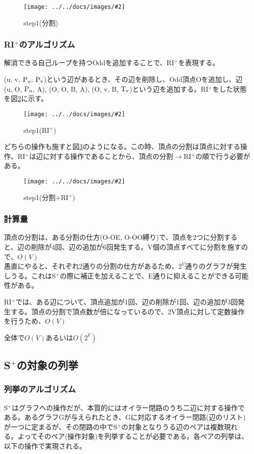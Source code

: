 \documentclass[11pt,a4j]{jarticle}
\newcommand{\splus}{S${}^\text{+}$}
\newcommand{\riplus}{RI${}^\text{+}$}
\newcommand{\f}[1]{$\rm{#1}$} %
\newcommand{\image}[4][height=100pt]{%
\begin{figure}[htbp]
    \centering
    \texttt{[image: ../../docs/images/\#2]}
    \caption{#3}
    \label{fig:#4}
\end{figure}%
}
\newcommand{\ra }{$\rightarrow$}
\begin{document}
\image{extend_split.jpg}{step1(分割)}{split}

\subsubsection{\riplus のアルゴリズム}
解消できる自己ループを持つOddを追加することで、\riplus を表現する。

(u, v, \f{P_u}, \f{P_v})という辺があるとき、その辺を削除し、Odd頂点Oを追加し、辺(u, O, \f{P_u}, A), (O, O, B, A), (O, v, B, \f{T_v})という辺を追加する。\riplus をした状態を図\ref{fig:riplus}に示す。

\image{extend_riplus.jpg}{step1(\riplus )}{riplus}

どちらの操作も施すと図\ref{fig:total}のようになる。この時、頂点の分割は頂点に対する操作、\riplus は辺に対する操作であることから、頂点の分割\ra \riplus の順で行う必要がある。
\image{extend_total.jpg}{step1(分割+\riplus )}{total}

\subsubsection{計算量}
頂点の分割は、ある分割の仕方(O-OE, O-OO縛り)で、頂点を2つに分割すると、辺の削除が4回、辺の追加が6回発生する。V個の頂点すべてに分割を施すので、$O(V)$\\
愚直にやると、それぞれ2通りの分割の仕方があるため、$2^V$通りのグラフが発生しうる。これは\splus の際に補正を加えることで、E通りに抑えることができる可能性がある。

\riplus では、ある辺について、頂点追加が1回、辺の削除が1回、辺の追加が3回発生する。頂点の分割で頂点数が倍になっているので、2V頂点に対して定数操作を行うため、$O(V)$

全体で$O(V)$あるいは$O(2^V)$

\subsection{\splus の対象の列挙}
\label{enum}
\subsubsection{列挙のアルゴリズム}
\splus はグラフへの操作だが、本質的にはオイラー閉路のうち二辺に対する操作である。あるグラフGが与えられたとき、Gに対応するオイラー閉路(辺のリスト)が一つに定まるが、その閉路の中で\splus の対象となりうる辺のペアは複数現れる。よってそのペア(操作対象)を列挙することが必要である。各ペアの列挙は、以下の操作で実現される。
\end{document}
